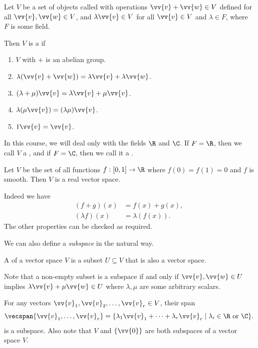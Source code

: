 \begin{definition}
  Let $V$ be a set of objects called  with operations $\vv{v} + \vv{w} \in V$ defined for all $\vv{v}, 
\vv{w} \in V$, and $\lambda \vv{v} \in V$ for all $\vv{v} \in V$ and $\lambda \in F$, where $F$ is some field. 

Then $V$ is a  if
\begin{enumerate}[label=(\roman*)]
    \item $V$ with $+$ is an abelian group.
    \item $\lambda( \vv{v} + \vv{w}) = \lambda \vv{v} + \lambda \vv{w}$.
    \item $(\lambda  + \mu)\vv{v} = \lambda \vv{v} + \mu \vv{v}$.
    \item $\lambda (\mu \vv{v}) = (\lambda \mu) \vv{v}$.
    \item $1 \vv{v} = \vv{v}$.
\end{enumerate}
\end{definition}

In this course, we will deal only with the fields $\R$ and $\C$. If $F = \R$, then we call $V$ a , and if $F = \C$, then we call it a .

\begin{example}
  Let $V$ be the set of all functions $f: [0, 1] \rightarrow \R$ where $f(0) = f(1) = 0$ and $f$ is smooth. Then $V$ is a real vector space.

  Indeed we have
  \begin{align*}
      (f + g)(x) &= f(x) + g(x), \\
      (\lambda f)(x) &= \lambda (f(x)).
  \end{align*}
  The other properties can be checked as required.
\end{example}

We can also define a \emph{subspace} in the natural way.

\begin{definition}[Subspace]
    A  of a vector space $V$ is a subset $U \subseteq V$ that is also a vector space.
\end{definition}

Note that a non-empty subset is a subspace if and only if $\vv{v}, \vv{w} \in U$ implies $\lambda \vv{v} + \mu \vv{w} \in U$ where $\lambda, \mu$ are some arbitrary scalars.

For any vectors $\vv{v}_1, \vv{v}_2, \dots, \vv{v}_r \in V$, their span
$$
    \vecspan \{\vv{v}_1, \dots, \vv{v}_r\} = \{ \lambda_1 \vv{v}_1 + \cdots + \lambda_r \vv{v}_r \mid \lambda_i \in \R \text{ or } \C \}.
$$
is a subspace. Also note that $V$ and $\{ \vv{0} \}$ are both subspaces of a vector space $V$.

